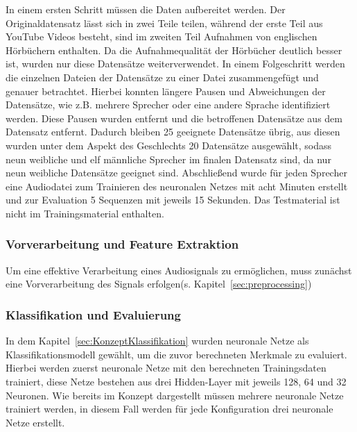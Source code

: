 In einem ersten Schritt müssen die Daten aufbereitet werden.
Der Originaldatensatz lässt sich in zwei Teile teilen, während der erste Teil aus YouTube Videos besteht, sind im zweiten Teil Aufnahmen von englischen Hörbüchern enthalten.
Da die Aufnahmequalität der Hörbücher deutlich besser ist, wurden nur diese Datensätze weiterverwendet.
In einem Folgeschritt werden die einzelnen Dateien der Datensätze zu einer Datei zusammengefügt und genauer betrachtet.
Hierbei konnten längere Pausen und Abweichungen der Datensätze, wie z.B. mehrere Sprecher oder eine andere Sprache identifiziert werden.
Diese Pausen wurden entfernt und die betroffenen Datensätze aus dem Datensatz entfernt.
Dadurch bleiben 25 geeignete Datensätze übrig, aus diesen wurden unter dem Aspekt des Geschlechts 20 Datensätze ausgewählt, sodass neun weibliche und elf männliche Sprecher im finalen Datensatz sind, da nur neun weibliche Datensätze geeignet sind.
Abschließend wurde für jeden Sprecher eine Audiodatei zum Trainieren des neuronalen Netzes mit acht Minuten erstellt und zur Evaluation 5 Sequenzen mit jeweils 15 Sekunden.
Das Testmaterial ist nicht im Trainingsmaterial enthalten.

\subsubsection{Vorverarbeitung und Feature Extraktion}

Um eine effektive Verarbeitung eines Audiosignals zu ermöglichen, muss zunächst eine Vorverarbeitung des Signals erfolgen(s. Kapitel~\ref{sec:preprocessing})


\subsubsection{Klassifikation und Evaluierung}
In dem Kapitel~\ref{sec:KonzeptKlassifikation} wurden neuronale Netze als Klassifikationsmodell gewählt, um die zuvor berechneten Merkmale zu evaluiert.
Hierbei werden zuerst neuronale Netze mit den berechneten Trainingsdaten trainiert, diese Netze bestehen aus drei Hidden-Layer mit jeweils 128, 64 und 32 Neuronen.
Wie bereits im Konzept dargestellt müssen mehrere neuronale Netze trainiert werden, in diesem Fall werden für jede Konfiguration drei neuronale Netze erstellt.

